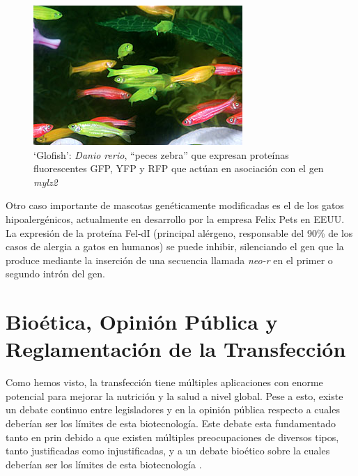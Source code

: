 \documentclass[fleqn,10pt]{SelfArx} %
\begin{document}
\begin{figure}[ht]\centering
\includegraphics[width=\linewidth]{images/danio}
\caption{`Glofish': \textit{Danio rerio}, ``peces zebra'' que expresan proteínas fluorescentes GFP, YFP y RFP que actúan en asociación con el gen \textit{mylz2} \cite{gong2003development, fox2008fda}}
\end{figure}    
    
    Otro caso importante de mascotas genéticamente modificadas es el de los gatos hipoalergénicos, actualmente en desarrollo por la empresa Felix Pets en EEUU. La expresión de la proteína Fel-dI (principal alérgeno, responsable del 90\% de los casos de alergia a gatos en humanos) se puede inhibir, silenciando el gen que la produce mediante la inserción de una secuencia llamada \textit{neo-r} en el primer o segundo intrón del gen\cite{avner2012method, butt2012hypoallergenic}. 
  
\section{Bioética, Opinión Pública y Reglamentación de la Transfección }

Como hemos visto, la transfección tiene múltiples aplicaciones con enorme potencial para mejorar la nutrición y la salud a nivel global. Pese a esto, existe un debate continuo entre legisladores y en la opinión pública respecto a cuales deberían ser los límites de esta biotecnología. Este debate esta fundamentado tanto en prin debido a que existen múltiples preocupaciones de diversos tipos, tanto justificadas como injustificadas, y a un debate bioético sobre la cuales deberían ser los límites de esta biotecnología \cite{berkowitz1993food, berkowitz1994transgenic, mepham1998use, christiansen2000bioethics, Iredale, Cooley, Rowland, Verhoog2003294, Spink, Jefferson,lassen2006after, Ormandy}.
\end{document}
